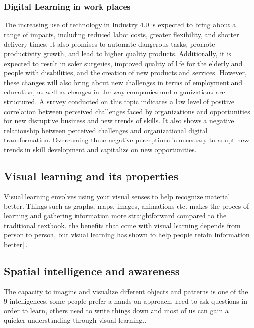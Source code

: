 \subsubsection*{Digital Learning in work places}\label{ch:digital_learning_work_places}

The increasing use of technology in Industry 4.0 is expected to bring about a range of impacts, including reduced labor costs, greater flexibility, and shorter delivery times. It also promises to automate dangerous tasks, promote productivity growth, and lead to higher quality products.
Additionally, it is expected to result in safer surgeries, improved quality of life for the elderly and people with disabilities, and the creation of new products and services. However, these changes will also bring about new challenges in terms of employment and education, as well as changes in the way companies and organizations are structured.
A survey conducted on this topic indicates a low level of positive correlation between perceived challenges faced by organizations and opportunities for new disruptive business and new trends of skills.
It also shows a negative relationship between perceived challenges and organizational digital transformation. Overcoming these negative perceptions is necessary to adopt new trends in skill development and capitalize on new opportunities.\cite*{Skills_Digital_Learning}

\subsection{Visual learning and its properties}\label{ch:visual_learning_and_its_properties}
Visual learning envolves using your visual senses to help recognize material better. Things such as graphs, maps, images, animations etc. makes the proces of learning and gathering information more straightforward
compared to the traditional textbook. the benefits that come with visual learning depends from person to person, but visual learning has shown to help people retain information better[].


\subsection{Spatial intelligence and awareness}\label{ch:spatial_intelligence_and_awareness}
The capacity to imagine and visualize different objects and patterns is one of the 9 intelligences, some people prefer a hands on approach, need to ask questions in order to learn, others need to write things down and most of us can gain a quicker understanding through visual learning.\cite*{pracpsych2022}.


